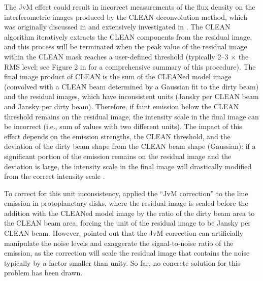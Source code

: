 \documentclass[linenumbers, twocolumn, twocolappendix, astrosymb, times]{aastex631}
\begin{document}
The JvM effect could result in incorrect measurements of the flux density on the interferometric images produced by the CLEAN deconvolution method, which was originally discussed in \citet{JvM} and extensively investigated in \citet{Czekala2021}. The CLEAN algorithm iteratively extracts the CLEAN components from the residual image, and this process will be terminated when the peak value of the residual image within the CLEAN mask reaches a user-defined threshold (typically 2--3 $\times$ the RMS level; see Figure 2 in \citet{Czekala2021} for a comprehensive summary of this procedure). The final image product of CLEAN is the sum of the CLEANed model image (convolved with a CLEAN beam determined by a Gaussian fit to the dirty beam) and the residual images, which have inconsistent units (Jansky per CLEAN beam and Jansky per dirty beam). Therefore, if faint emission below the CLEAN threshold remains on the residual image, the intensity scale in the final image can be incorrect (i.e., sum of values with two different units). The impact of this effect depends on the emission strengths, the CLEAN threshold, and the deviation of the dirty beam shape from the CLEAN beam shape (Gaussian): if a significant portion of the emission remains on the residual image and the deviation is large, the intensity scale in the final image will drastically modified from the correct intensity scale \citep{JvM, Czekala2021}.  

To correct for this unit inconsistency, \citet{Czekala2021} applied the ``JvM correction'' to the line emission in protoplanetary disks, where the residual image is scaled before the addition with the CLEANed model image by the ratio of the dirty beam area to the CLEAN beam area, forcing the unit of the residual image to be Jansky per CLEAN beam. However, \citet{Casassus2022} pointed out that the JvM correction can artificially manipulate the noise levels and exaggerate the signal-to-noise ratio of the emission, as the correction will scale the residual image that contains the noise typically by a factor smaller than unity. So far, no concrete solution for this problem has been drawn.
\end{document}
